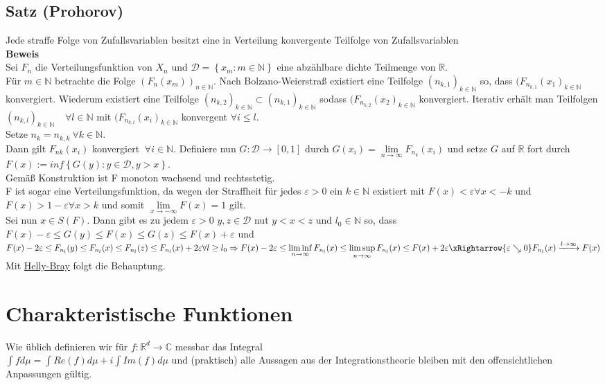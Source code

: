 \documentclass[german,10pt,oneside, fleqn, a4paper]{article}
\newcommand {\R}	{\mathbb{R}}
\newcommand {\N}	{\mathbb{N}}
\newcommand {\C}	{\mathbb{C}}
\newcommand{\Ra}	{\Rightarrow}
\newcommand{\ra}{\rightarrow}
\newcommand{\lsup}[1][n]{\limsup\limits_{#1\rightarrow\infty}}
\newcommand{\linf}[1][n]{\liminf\limits_{#1\rightarrow\infty}}
\newcommand{\brac}[1]{\left\lbrace #1\right\rbrace}
\newcommand{\mc}[1]{\mathcal{#1}}
\newcommand{\beweis}{\textbf{Beweis}\\}
\newcommand{\toinf}{\rightarrow\infty}
\newcommand{\fn}[1][n]{\ \forall #1\in\N}
\newcommand{\1}[1]{1_{#1}}
\newcommand{\2}[1]{\1{\brac{#1}}}
\newcommand{\xr}[2][]{\xrightarrow[#1]{#2}}
\begin{document}
\subsection{Satz (Prohorov)}
\label{3.15}
Jede straffe Folge von Zufallsvariablen besitzt eine in Verteilung konvergente Teilfolge von Zufallsvariablen\\
\beweis
Sei $F_n$ die Verteilungsfunktion von $X_n$ und $\mc{D}=\brac{x_m:m\in\N}$ eine abzählbare dichte Teilmenge von $\R$.\\
Für $m\in\N$ betrachte die Folge $(F_n(x_m))_{n\in\N}$. Nach Bolzano-Weierstraß existiert eine Teilfolge  $(n_{k,1})_{k\in\N}$ so, dass $(F_{n_{k,1}}(x_1)_{k\in\N}$ konvergiert. Wiederum existiert eine Teilfolge $(n_{k,2})_{k\in\N}\subset(n_{k,1})_{k\in\N}$ sodass $(F_{n_{k,2}}(x_2)_{k\in\N}$ konvergiert. Iterativ erhält man Teilfolgen $(n_{k,l})_{k\in\N}$ \ $\fn[l]$ mit $(F_{n_{k,l}}(x_i)_{k\in\N}$ konvergent $\forall i\leq l$.\\
Setze $n_k=n_{k,k}\ \forall k\in\N$.\\
Dann gilt $F_{nk}(x_i)$ konvergiert $\fn[i]$. Definiere nun $G:\mc{D}\ra[0,1]$ durch $G(x_i)=\lim\limits_{n\toinf}F_{n_k}(x_i)$ und setze $G$ auf $\R$ fort durch $F(x):=inf\brac{G(y):y\in\mc{D},y>x}$.\\
Gemäß Konstruktion ist F monoton wachsend und rechtsstetig.\\
F ist sogar eine Verteilungsfunktion, da wegen der Straffheit für jedes $\varepsilon>0$ ein $k\in\N$ existiert mit $F(x)<\varepsilon\forall x<-k$ und $F(x)>1-\varepsilon \forall x>k$ und somit $\lim\limits_{x\ra -\infty}F(x)=1$ gilt.\\
Sei nun $x\in S(F)$. Dann gibt es zu jedem $\varepsilon>0$ $y,z\in\mc{D}$ nut $y<x<z$ und $l_0\in\N$ so, dass \\
$F(x)-\varepsilon\leq G(y)\leq F(x)\leq G(z)\leq F(x)+\varepsilon$ und\\
$F(x)-2\varepsilon\leq F_{n_l}(y)\leq F_{n_l}(x)\leq F_{n_l}(z)\leq F_{n_l}(x)+2\varepsilon \forall l\geq l_0\\
\Ra F(x)-2\varepsilon\leq\linf F_{n_l}(x)\leq \lsup F_{n_l}(x)\leq F(x)+2\varepsilon\\
\xRightarrow{\varepsilon\searrow0}F_{n_l}(x)\xr{l\toinf}F(x)$\\
Mit \hyperref[3.8]{Helly-Bray} folgt die Behauptung.







\pagebreak
\section{Charakteristische Funktionen}
Wie üblich definieren wir für $f:\R^d\ra\C$ messbar das Integral \\
$\int fd\mu=\int Re(f)d\mu+i\int Im(f)d\mu$ und (praktisch) alle Aussagen aus der Integrationstheorie bleiben mit den offensichtlichen Anpassungen gültig.
\end{document}
